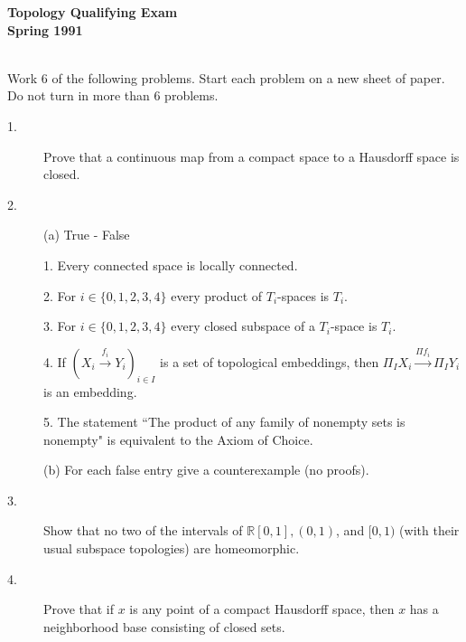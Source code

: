 \documentclass{article}
\def\R{\mathbb R}
\begin{document}






\begin{center}\begin{LARGE}
{\bf Topology Qualifying Exam}\\ 
{\bf Spring 1991}\\ \end{LARGE}
\end{center}
\vspace{0.1in}
\noindent\hrulefill\\

Work 6 of the following problems. Start each problem on a new sheet of
paper. Do not turn in more than 6 problems.

\begin{description}
\item[1.]
Prove that a continuous map from a compact space to a Hausdorff space
is closed.

\item[2.] (a)
True - False

\item[\qquad] 1.
Every connected space is locally connected.

\item[\qquad] 2.
For $i \in \{ 0,1,2,3,4\}$ every product of $T_i$-spaces is $T_i$.

\item[\qquad] 3.
For $i \in \{0,1,2,3,4\}$ every closed subspace of a $T_i$-space
is $T_i$.

\item[\qquad] 4.
If $(X_i \stackrel{f_i}{\longrightarrow} Y_i)_{i \in I}$
is a set of topological
embeddings, then $\Pi_I X_i \stackrel{\Pi f_i}{\longrightarrow} \Pi_IY_i$
is an embedding.

\item[\qquad] 5.
The statement ``The product of any family of nonempty sets is nonempty"
is equivalent to the Axiom of Choice.

\item[\quad] (b)
For each false entry give a counterexample (no proofs).

\item[3.]
Show that no two of the intervals of $\R [0,1], (0,1)$, and $[0,1)$
(with their usual subspace topologies) are homeomorphic.

\item[4.]
Prove that if $x$ is any point of a compact Hausdorff space, then $x$
has a neighborhood base consisting of closed sets.


\end{description}
\end{document}
